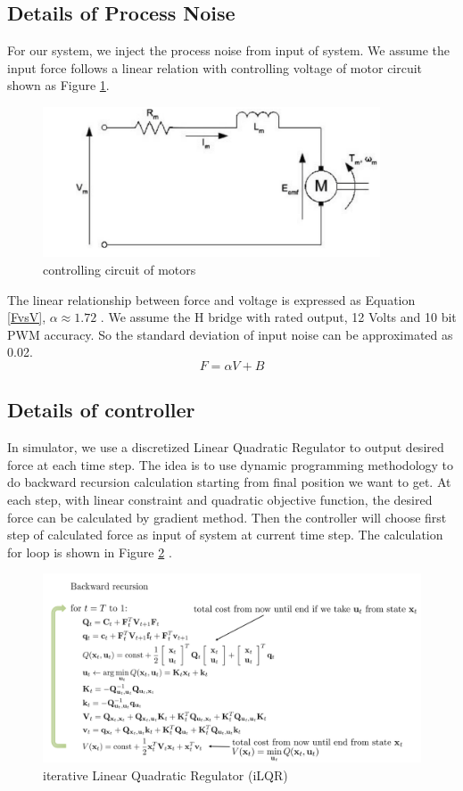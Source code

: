 \documentclass{article}
\begin{document}
\subsection{Details of Process Noise}\label{appendix:processNoise}
For our system, we inject the process noise from input of system. We assume the input force follows a linear relation with controlling voltage of motor circuit shown as Figure \ref{fig:circuit}.
\begin{figure}[h!]
	\centering
	\includegraphics[width=10cm,keepaspectratio]{circuit.png}
	\caption{controlling circuit of motors}
	\label{fig:circuit}
\end{figure}
The linear relationship between force and voltage is expressed as Equation \ref{FvsV}, $\alpha \approx 1.72$ \cite{lab3}. We assume the H bridge with rated output, 12 Volts and 10 bit PWM accuracy. So the standard deviation of input noise can be approximated as 0.02.
\begin{equation}
F = \alpha V + B
\label{FvsV}
\end{equation}
\subsection{Details of controller}
In simulator, we use a discretized Linear Quadratic Regulator to output desired force at each time step. The idea is to use dynamic programming methodology to do backward recursion calculation starting from final position we want to get. At each step, with linear constraint and quadratic objective function, the desired force can be calculated by gradient method. Then the controller will choose first step of calculated force as input of system at current time step. The calculation for loop is shown in Figure \ref{fig:iLQR} \cite{puterman2014markov}.
\begin{figure}[h!]
	\centering
	\includegraphics[width=15cm,keepaspectratio]{LQR.png}
	\caption{iterative Linear Quadratic Regulator (iLQR)}
	\label{fig:iLQR}
\end{figure}
\end{document}
